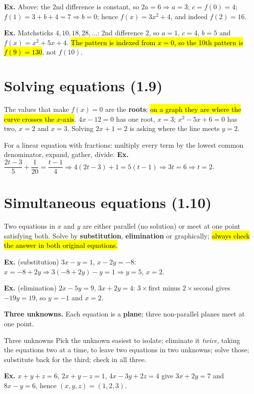 \documentclass[11pt]{article}
\newcommand{\key}[1]{\hl{#1}}
\newcommand{\wex}[1]{{\color{lilacdeep}\textbf{Ex.}} #1}
\begin{document}
\wex{Above: the 2nd difference is constant, so $2a=6\Rightarrow a=3$; $c=f(0)=4$; $f(1)=3+b+4=7\Rightarrow b=0$; hence $f(x)=3x^{2}+4$, and indeed $f(2)=16$.}

\wex{Matchsticks $4,10,18,28,\dots$: 2nd difference 2, so $a=1$, $c=4$, $b=5$ and $f(x)=x^{2}+5x+4$. \key{The pattern is indexed from \mbox{$x=0$}, so the 10th pattern is \mbox{$f(9)=130$}}, not $f(10)$.}

\section{Solving equations (1.9)}

The values that make $f(x)=0$ are the \textbf{roots}; \key{on a graph they are where the curve crosses the \mbox{$x$}-axis}. $4x-12=0$ has one root, $x=3$; $x^{2}-5x+6=0$ has two, $x=2$ and $x=3$. Solving $2x+1=2$ is asking where the line meets $y=2$.

For a linear equation with fractions: multiply every term by the lowest common denominator, expand, gather, divide.
\wex{$\dfrac{2t-3}{5}+\dfrac{1}{20}=\dfrac{t-1}{4}\Rightarrow4(2t-3)+1=5(t-1)\Rightarrow3t=6\Rightarrow t=2$.}

\section{Simultaneous equations (1.10)}

Two equations in $x$ and $y$ are either parallel (no solution) or meet at one point satisfying both. Solve by \textbf{substitution}, \textbf{elimination} or graphically; \key{always check the answer in both original equations.}

\wex{(substitution) $3x-y=1$, $x-2y=-8$: $x=-8+2y\Rightarrow3(-8+2y)-y=1\Rightarrow y=5$, $x=2$.}

\wex{(elimination) $2x-5y=9$, $3x+2y=4$: $3\times$first minus $2\times$second gives $-19y=19$, so $y=-1$ and $x=2$.}

\textbf{Three unknowns.} Each equation is a \textbf{plane}; three non-parallel planes meet at one point.

\begin{methodbox}{Three unknowns}
Pick the unknown easiest to isolate; eliminate it \emph{twice}, taking the equations two at a time, to leave two equations in two unknowns; solve those; substitute back for the third; check in all three.
\end{methodbox}

\wex{$x+y+z=6$, $2x+y-z=1$, $4x-3y+2z=4$ give $3x+2y=7$ and $8x-y=6$, hence $(x,y,z)=(1,2,3)$.}
\end{document}
